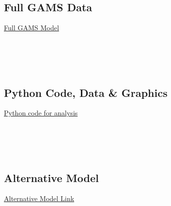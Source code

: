 \subsection{Full GAMS Data}
\label{app:fullModel}
\href{https://zenodo.org/records/15250066?token=eyJhbGciOiJIUzUxMiJ9.eyJpZCI6ImQ0YTVlZDAzLWU0NDktNDkyYS1iZGNlLTZjMTc3YWNmM2Y3ZCIsImRhdGEiOnt9LCJyYW5kb20iOiJhMDhlZTcwOTU3MjFiZmExMGY0YmUzMjUwZGM2ZjY5ZCJ9.RLOwEcGXlgFzX0IFm-1bEa9GjshtvCu_SmehFOBJg8yQ11NlqWq_4L8OuvG4eeULVS_BRhnSywxuA7vsCfTH9w}{Full GAMS Model}\\

\texttt{}\\
\texttt{}\\
\texttt{}\\
\texttt{}\\
\texttt{}

\subsection{Python Code, Data \& Graphics}
\label{app:python}
\href{https://zenodo.org/records/15250072?token=eyJhbGciOiJIUzUxMiJ9.eyJpZCI6ImNmZDY2ZTRmLThiZjctNDI2Yy1hMjkzLWI5NDZkYmVkMTllNSIsImRhdGEiOnt9LCJyYW5kb20iOiJhNjI4MWVmYmJiMGViZTYzOTU0ZDVjMTRmNDU4MWJiMCJ9.uA9bX6OLFf9Pp2ubAHRNnt2GhgJh5wo5rXNeOsO-d_enloZMZBcsV4rCj-NJIkZboyPzi6s5PkMfnyhZUCjNkQ}{Python code for analysis}\\

\texttt{}\\
\texttt{}\\
\texttt{}\\
\texttt{}\\
\texttt{}

\subsection{Alternative Model}
\label{app:altModel}
\href{https://zenodo.org/records/15250055?token=eyJhbGciOiJIUzUxMiJ9.eyJpZCI6IjE1YWFjM2QxLWJmOTItNDliOS1iNDY4LWZmODkyNjY1OWRiNiIsImRhdGEiOnt9LCJyYW5kb20iOiI3ZGI5YjEyODgyNzgxYzdhNGE5Zjc1NWIwOWVhN2YxNSJ9.FBCfOpGd3SIIQKDdfnO6MmOsvnNoW9iQm4AwVD-54T6XpgzppI0E8JzMH1Oq6b0KZh-11kKp2PpRsM_fNMbOnQ}{Alternative Model Link}\\

